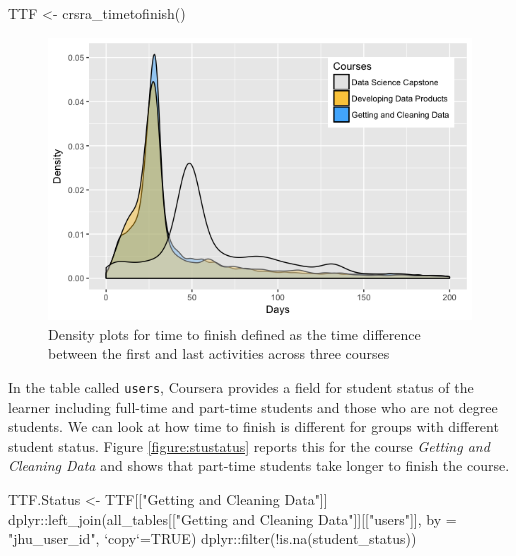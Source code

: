 \begin{Schunk}
\begin{Sinput}
TTF <- crsra_timetofinish()
\end{Sinput}
\end{Schunk}

\begin{figure}[htbp]
    \centering
    \includegraphics[scale=0.5]{timetofinish}
    \caption{Density plots for time to finish defined as the time difference between the first and last activities across three courses}
    \label{figure:timetofinish}
\end{figure}

In the table called \texttt{users}, Coursera provides a field for
student status of the learner including full-time and part-time students
and those who are not degree students. We can look at how time to finish
is different for groups with different student status. Figure
\ref{figure:stustatus} reports this for the course \emph{Getting and
Cleaning Data} and shows that part-time students take longer to finish
the course.

\begin{Schunk}
\begin{Sinput}
TTF.Status <- TTF[["Getting and Cleaning Data"]] %
    dplyr::left_join(all_tables[["Getting and Cleaning Data"]][["users"]], 
                     by = "jhu_user_id", `copy`=TRUE) %
    dplyr::filter(!is.na(student_status))
\end{Sinput}
\end{Schunk}

